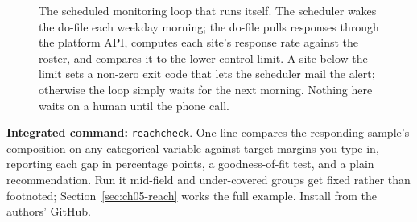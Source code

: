 \documentclass[
    a4paper,
    fontsize=10pt,
    twoside=true,
    numbers=noenddot,
]{kaobook}
\begin{document}
\begin{figure}[htbp]
\centering
{}
\caption[The scheduled monitoring loop]{The scheduled monitoring loop that runs itself. The scheduler wakes the do-file each weekday morning; the do-file pulls responses through the platform API, computes each site's response rate against the roster, and compares it to the lower control limit. A site below the limit sets a non-zero exit code that lets the scheduler mail the alert; otherwise the loop simply waits for the next morning. Nothing here waits on a human until the phone call.}
\label{fig:ch05-viz-cronloop}
\end{figure}

\begin{kaobox}[frametitle=Package Integration: \texttt{reachcheck}]
\textbf{Integrated command:} \texttt{reachcheck}. One line compares the responding sample's composition on any categorical variable against target margins you type in, reporting each gap in percentage points, a goodness-of-fit test, and a plain recommendation. Run it mid-field and under-covered groups get fixed rather than footnoted; Section~\ref{sec:ch05-reach} works the full example. Install from the authors' GitHub.
\end{kaobox}
\end{document}
